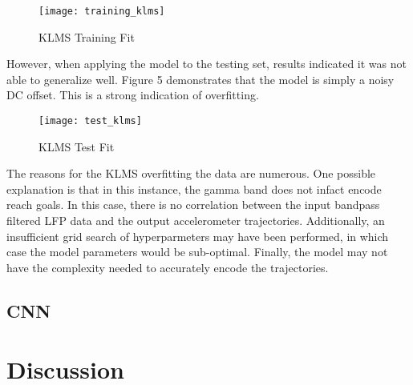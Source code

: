\documentclass[12pt]{article}
\begin{document}
\begin{figure}[h]
\caption{KLMS Training Fit}
\centering
\texttt{[image: training\_klms]}
\end{figure}

However, when applying the model to the testing set, results indicated it was not able to generalize well. Figure 5 demonstrates that the model is simply a noisy DC offset. This is a strong indication of overfitting.

\begin{figure}[h]
\caption{KLMS Test Fit}
\centering
\texttt{[image: test\_klms]}
\end{figure}

The reasons for the KLMS overfitting the data are numerous. One possible explanation is that in this instance, the gamma band does not infact encode reach goals. In this case, there is no correlation between the input bandpass filtered LFP data and the output accelerometer trajectories. Additionally, an insufficient grid search of hyperparmeters may have been performed, in which case the model parameters would be sub-optimal. Finally, the model may not have the complexity needed to accurately encode the trajectories.

\subsection{CNN}


\section{Discussion}




\end{document}
